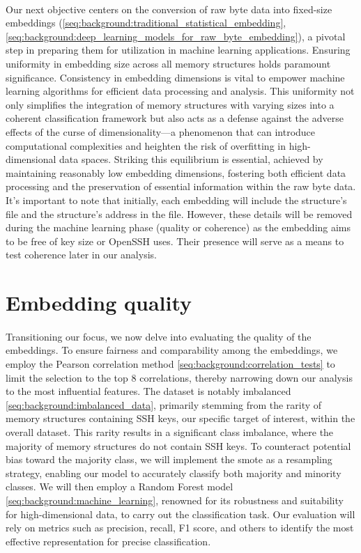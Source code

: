         \paragraph{}Our next objective centers on the conversion of raw byte data into fixed-size embeddings (\ref{seq:background:traditional_statistical_embedding}, \ref{seq:background:deep_learning_models_for_raw_byte_embedding}), a pivotal step in preparing them for utilization in machine learning applications. Ensuring uniformity in embedding size across all memory structures holds paramount significance. Consistency in embedding dimensions is vital to empower machine learning algorithms for efficient data processing and analysis. This uniformity not only simplifies the integration of memory structures with varying sizes into a coherent classification framework but also acts as a defense against the adverse effects of the curse of dimensionality—a phenomenon that can introduce computational complexities and heighten the risk of overfitting in high-dimensional data spaces. Striking this equilibrium is essential, achieved by maintaining reasonably low embedding dimensions, fostering both efficient data processing and the preservation of essential information within the raw byte data. It's important to note that initially, each embedding will include the structure's file and the structure's address in the file. However, these details will be removed during the machine learning phase (quality or coherence) as the embedding aims to be free of key size or OpenSSH uses. Their presence will serve as a means to test coherence later in our analysis.

    \section{Embedding quality}
        \paragraph{} Transitioning our focus, we now delve into evaluating the quality of the embeddings. To ensure fairness and comparability among the embeddings, we employ the Pearson correlation method \ref{seq:background:correlation_tests} to limit the selection to the top 8 correlations, thereby narrowing down our analysis to the most influential features. The dataset is notably imbalanced \ref{seq:background:imbalanced_data}, primarily stemming from the rarity of memory structures containing SSH keys, our specific target of interest, within the overall dataset. This rarity results in a significant class imbalance, where the majority of memory structures do not contain SSH keys. To counteract potential bias toward the majority class, we will implement the \acrfull{smote} as a resampling strategy, enabling our model to accurately classify both majority and minority classes. We will then employ a Random Forest model \ref{seq:background:machine_learning}, renowned for its robustness and suitability for high-dimensional data, to carry out the classification task. Our evaluation will rely on metrics such as precision, recall, F1 score, and others to identify the most effective representation for precise classification.


